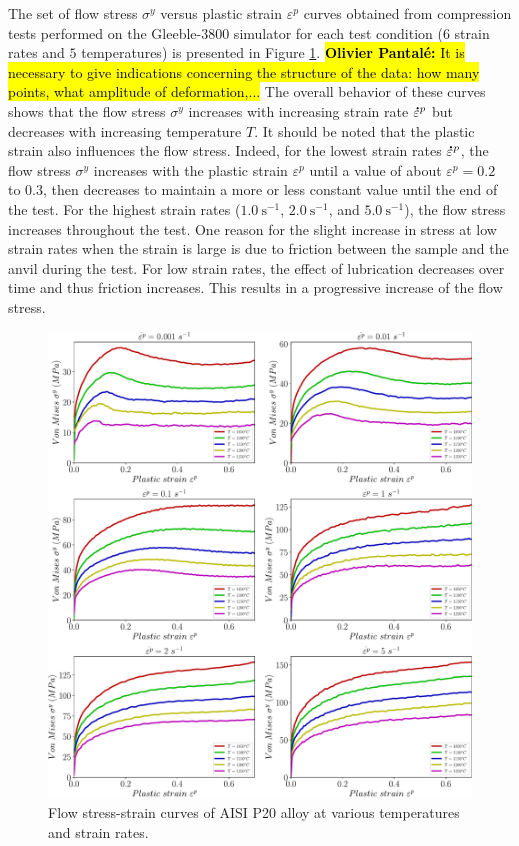 \documentclass[twoside,english,1p,final,sort&compress]{elsarticle}
\theoremstyle{plain}
\newcommand{\mdot}[1]{\accentset{\mbox{\bfseries .}}{#1}}
\DeclareRobustCommand{\OP}[1]{ {\begingroup\sethlcolor{VWyellow}\textcolor{red}{\hl{\textbf{Olivier Pantal\'e:} #1}}\endgroup} }
\begin{document}
The set of flow stress $\sigma^y$ versus plastic strain $\varepsilon^p$ curves obtained from compression tests performed on the Gleeble-3800 simulator for each test condition ($6$ strain rates and $5$ temperatures) is presented in Figure \ref{fig:rawData}.
\OP{It is necessary to give indications concerning the structure of the data: how many points, what amplitude of deformation,...} The overall behavior of these curves shows that the flow stress $\sigma^y$ increases with increasing strain rate $\mdot\varepsilon^p$ but decreases with increasing temperature $T$.
It should be noted that the plastic strain also influences the flow stress.
Indeed, for the lowest strain rates $\mdot\varepsilon^p$, the flow stress $\sigma^y$ increases with the plastic strain $\varepsilon^p$ until a value of about $\varepsilon^p=0.2$ to $0.3$, then decreases to maintain a more or less constant value until the end of the test.
For the highest strain rates ($1.0~\text{s}^{-1}$, $2.0~\text{s}^{-1}$, and $5.0~\text{s}^{-1}$), the flow stress increases throughout the test.
One reason for the slight increase in stress at low strain rates when the strain is large is due to friction between the sample and the anvil during the test.
For low strain rates, the effect of lubrication decreases over time and thus friction increases.
This results in a progressive increase of the flow stress.

\begin{figure}[!ht]
\centering
\includegraphics[width=1.02\columnwidth]{Figures/rawData}
\caption{Flow stress-strain curves of AISI P20 alloy at various temperatures and strain rates.}
\label{fig:rawData}
\end{figure}
\end{document}
